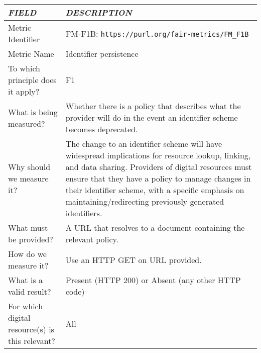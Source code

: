 \documentclass[english]{article}
\begin{document}
\newpage

\centering

\begin{longtable}{|p{5cm}|p{9cm}|}
\hline
\emph{FIELD} & \emph{DESCRIPTION} \\
\hline
Metric Identifier &   FM-F1B: \verb"https://purl.org/fair-metrics/FM_F1B"
 \\


\hline
Metric Name &   
Identifier persistence
 \\



\hline
To which principle does it apply? &   F1\\



\hline
What is being measured? & Whether there is a policy that describes what the provider will do in the event an identifier scheme becomes deprecated.\\



\hline
Why should we measure it? & 

The change to an identifier scheme will have widespread implications for resource lookup, linking, and data sharing. Providers of digital resources must ensure that they have a policy to manage changes in their identifier scheme, with a specific emphasis on maintaining/redirecting previously generated identifiers.
  
\\



\hline
What must be provided? &  
A URL that resolves to a document containing the relevant policy.
 \\



\hline
How do we measure it? &  
Use an HTTP GET on URL provided. \newline
\\



\hline
What is a valid result? &  
Present (HTTP 200) or Absent (any other HTTP code)
\\



\hline
For which digital resource(s) is this relevant? &  All\\




\end{longtable}
\end{document}
